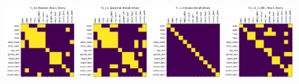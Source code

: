 \begin{figure}
    \includegraphics[width=0.24\textwidth]{diss/7_cond/figs/T1_1.0_Pearson_Result_Binary.png}
    \includegraphics[width=0.24\textwidth]{diss/7_cond/figs/T1_1.0_Spearman_Result_Binary.png}
    \includegraphics[width=0.24\textwidth]{diss/7_cond/figs/T1_1.0_Glasso_Result_Binary.png}
    \includegraphics[width=0.24\textwidth]{diss/7_cond/figs/T1_1.0_CODEC_Result_Binary.png}
    

\end{figure}
